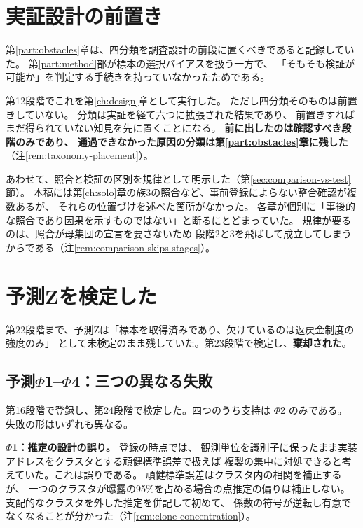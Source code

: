 \section{実証設計の前置き}

第\ref{part:obstacles}章は、四分類を調査設計の前段に置くべきであると記録していた。
第\ref{part:method}部が標本の選択バイアスを扱う一方で、
「そもそも検証が可能か」を判定する手続きを持っていなかったためである。

第12段階でこれを第\ref{ch:design}章として実行した。
ただし四分類そのものは前置きしていない。
分類は実証を経て六つに拡張された結果であり、
前置きすればまだ得られていない知見を先に置くことになる。
\textbf{前に出したのは確認すべき段階のみであり、
通過できなかった原因の分類は第\ref{part:obstacles}章に残した}（注\ref{rem:taxonomy-placement}）。

あわせて、照合と検証の区別を規律として明示した（第\ref{sec:comparison-vs-test}節）。
本稿には第\ref{ch:solo}章の族3の照合など、事前登録によらない整合確認が複数あるが、
それらの位置づけを述べた箇所がなかった。
各章が個別に「事後的な照合であり因果を示すものではない」と断るにとどまっていた。
規律が要るのは、照合が母集団の宣言を要さないため
段階2と3を飛ばして成立してしまうからである（注\ref{rem:comparison-skips-stages}）。

\section{予測Zを検定した}

第22段階まで、予測Zは「標本を取得済みであり、欠けているのは返戻金制度の強度のみ」
として未検定のまま残していた。第23段階で検定し、\textbf{棄却された}。

\subsection{予測\texorpdfstring{$\Phi$}{Phi}1--\texorpdfstring{$\Phi$}{Phi}4：三つの異なる失敗}

第16段階で登録し、第24段階で検定した。四つのうち支持は $\Phi$2 のみである。
失敗の形はいずれも異なる。

\textbf{$\Phi$1：推定の設計の誤り。} 登録の時点では、
観測単位を識別子に保ったまま実装アドレスをクラスタとする頑健標準誤差で扱えば
複製の集中に対処できると考えていた。これは誤りである。
頑健標準誤差はクラスタ内の相関を補正するが、
一つのクラスタが曝露の95\%を占める場合の点推定の偏りは補正しない。
支配的なクラスタを外した推定を併記して初めて、
係数の符号が逆転し有意でなくなることが分かった（注\ref{rem:clone-concentration}）。

